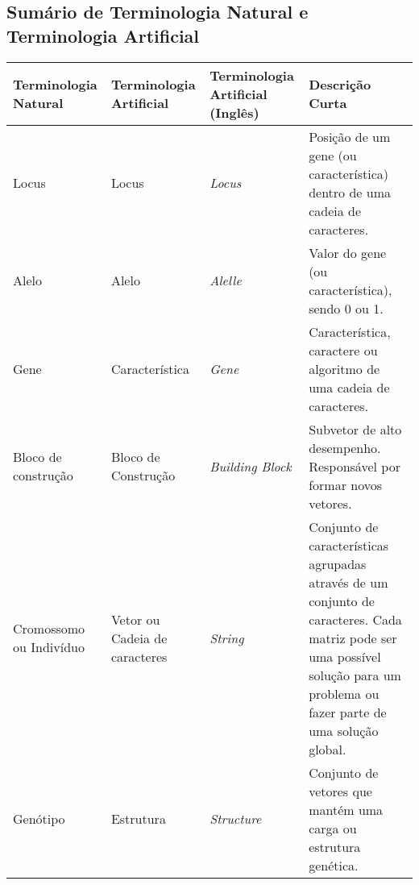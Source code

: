 \appendixpage
\begin{appendices}

\chapter{Sumário de Terminologia Natural e Terminologia Artificial}
\begin{table}[h!]
\centering
\begin{tabular}{ | >{\centering\arraybackslash}m{} | >{\centering\arraybackslash}m{} | >{\centering\arraybackslash}m{} | >{\centering\arraybackslash}m{} | } \hline
        Terminologia Natural               &   Terminologia Artificial            &   Terminologia Artificial (Inglês)   & Descrição Curta                                                                     \\ \hline
        Locus                              &   Locus                              &   \textit{Locus}                              & Posição de um gene (ou característica) dentro de uma cadeia de caracteres. \\ \hline
        Alelo                              &   Alelo                              &   \textit{Alelle}                             & Valor do gene (ou característica), sendo 0 ou 1.                           \\ \hline
        Gene                               &   Característica                     &   \textit{Gene}                               & Característica, caractere ou algoritmo de uma cadeia de caracteres.        \\ \hline
        Bloco de construção                &   Bloco de Construção                &   \textit{Building Block}                     & Subvetor de alto desempenho. Responsável por formar novos vetores.         \\ \hline
        Cromossomo ou Indivíduo            &   Vetor ou Cadeia de caracteres      &   \textit{String}                             & Conjunto de características agrupadas através de um conjunto de caracteres. Cada matriz pode ser uma possível solução para um problema ou fazer parte de uma solução global.                                                                                                                        \\ \hline
        Genótipo                           &   Estrutura                          &   \textit{Structure}                          & Conjunto de vetores que mantém uma carga ou estrutura genética.            \\ \hline

\end{tabular}
\end{table}
\end{appendices}
